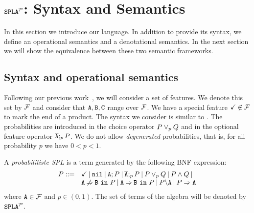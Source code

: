 \section{$\fodaPAp$: Syntax and Semantics}
\label{sec:stat:sintax}
In this section we introduce our language. In addition to provide its syntax, we define an operational semantics and a denotational semantics. In the next section we will show the equivalence between these two semantic frameworks.

\subsection{Syntax and operational semantics}
\label{sec:stat:sintax}
Following our previous work~\cite{acl13,cln16}, we will consider a
set of features. We denote this set by $\calF$ and consider that $\feature{A}, \feature{B},
\feature{C}$ range over $\calF$. We have a special feature
$\checkmark\not\in\calF$ to mark the end  of a product. The syntax we consider is similar to
\fodaPA. The probabilities are introduced in the choice operator $P \choice_{p} Q $ and in
the optional feature operator $\ofeature{A};_{p} P$. We do not allow
\emph{degenerated} probabilities, that is, for all probability $p$ we have $0< p<1$.

\bdfn
\label{sec:stat:sintax:dfn}
A \emph{probabilitistc SPL} is a term generated by the following
BNF expression:
$$
\begin{array}{ll}
P::=& \checkmark \barra \nil \barra \feature{A};P \barra
\ofeature{A};_{p} P \barra P \choice_{p} Q \barra P \paral Q \barra
\\
& \exclude{A}{B}{P}\barra  \require{A}{B}{P}\barra  \forbid{A}{P}\barra  \mandatory{A}{P}\\
\end{array}
$$
\noindent
where $\feature{A} \in \calF$ and $p\in(0,1)$. The set of terms of the
algebra will be denoted by  $\fodaPAp$.
\edfn
{}


